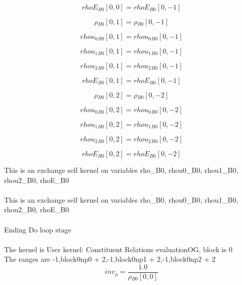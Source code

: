 \documentclass{article}
\begin{document}
\begin{dmath}{rhoE{_{B0}}}[{0,0}] = {rhoE{_{B0}}}[{0,-1}]\end{dmath}

\begin{dmath}{\rho{_{B0}}}[{0,1}] = {\rho{_{B0}}}[{0,-1}]\end{dmath}

\begin{dmath}{rhou_{0}{_{B0}}}[{0,1}] = {rhou_{0}{_{B0}}}[{0,-1}]\end{dmath}

\begin{dmath}{rhou_{1}{_{B0}}}[{0,1}] = {rhou_{1}{_{B0}}}[{0,-1}]\end{dmath}

\begin{dmath}{rhou_{2}{_{B0}}}[{0,1}] = {rhou_{2}{_{B0}}}[{0,-1}]\end{dmath}

\begin{dmath}{rhoE{_{B0}}}[{0,1}] = {rhoE{_{B0}}}[{0,-1}]\end{dmath}

\begin{dmath}{\rho{_{B0}}}[{0,2}] = {\rho{_{B0}}}[{0,-2}]\end{dmath}

\begin{dmath}{rhou_{0}{_{B0}}}[{0,2}] = {rhou_{0}{_{B0}}}[{0,-2}]\end{dmath}

\begin{dmath}{rhou_{1}{_{B0}}}[{0,2}] = {rhou_{1}{_{B0}}}[{0,-2}]\end{dmath}

\begin{dmath}{rhou_{2}{_{B0}}}[{0,2}] = {rhou_{2}{_{B0}}}[{0,-2}]\end{dmath}

\begin{dmath}{rhoE{_{B0}}}[{0,2}] = {rhoE{_{B0}}}[{0,-2}]\end{dmath}

\noindent This is an exchange self kernel on variables rho_B0, rhou0_B0, rhou1_B0, rhou2_B0, rhoE_B0\\\\\noindent This is an exchange self kernel on variables rho_B0, rhou0_B0, rhou1_B0, rhou2_B0, rhoE_B0\\\\\noindent Ending Do loop stage\\
\\\noindent The kernel is User kernel: Constituent Relations evaluationOG, block is 0\\\noindent The ranges are -1,block0np0 + 2,-1,block0np1 + 2,-1,block0np2 + 2\\\begin{dmath}inv_{\rho} = \frac{1.0}{{\rho{_{B0}}}[{0,0}]}\end{dmath}
\end{document}
